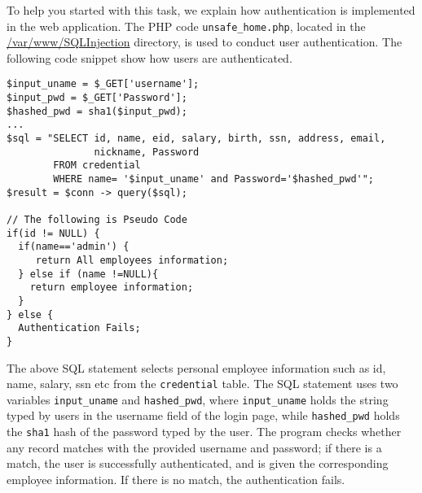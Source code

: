 To help you started with this task, we explain how authentication
is implemented in the web application. The PHP code 
\texttt{unsafe\_home.php}, located in the \url{/var/www/SQLInjection} directory, 
is used to conduct user authentication.
The following code snippet show how users are authenticated. 

\begin{lstlisting}
$input_uname = $_GET['username'];
$input_pwd = $_GET['Password'];
$hashed_pwd = sha1($input_pwd);
...
$sql = "SELECT id, name, eid, salary, birth, ssn, address, email, 
               nickname, Password
        FROM credential
        WHERE name= '$input_uname' and Password='$hashed_pwd'";
$result = $conn -> query($sql);

// The following is Pseudo Code 
if(id != NULL) {
  if(name=='admin') {
     return All employees information;
  } else if (name !=NULL){
    return employee information;
  }
} else {
  Authentication Fails;
}
\end{lstlisting}

The above SQL statement selects personal employee information such as id,
name, salary, ssn etc from the {\tt credential} table. The SQL statement
uses two variables \texttt{input\_uname} and \texttt{hashed\_pwd},
where \texttt{input\_uname} holds the string typed by 
users in the username field of the login page, while 
\texttt{hashed\_pwd} holds the \texttt{sha1} hash of the password typed by
the user. The program checks whether 
any record matches with the provided username and password; if there is a match,
the user is successfully authenticated, and is given the corresponding 
employee information. If there is no match, the authentication
fails. 



